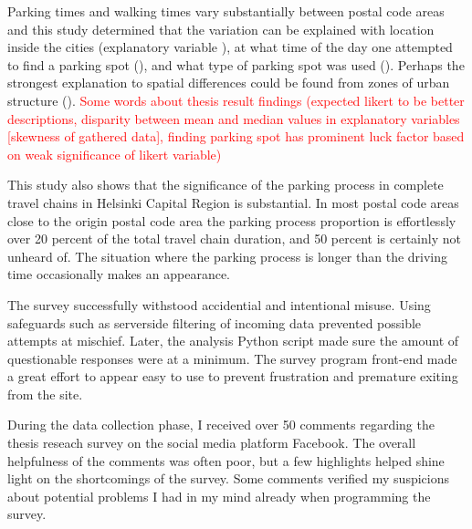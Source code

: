 Parking times and walking times vary substantially between postal code areas and this study determined that the variation can be explained with location inside the cities (explanatory variable ), at what time of the day one attempted to find a parking spot (), and what type of parking spot was used (). Perhaps the strongest explanation to spatial differences could be found from zones of urban structure (). 
\textcolor{red}{Some words about thesis result findings (expected likert to be better descriptions, disparity between mean and median values in explanatory variables [skewness of gathered data], finding parking spot has prominent luck factor based on weak significance of likert variable)}

This study also shows that the significance of the parking process in complete travel chains in Helsinki Capital Region is substantial. In most postal code areas close to the origin postal code area the parking process proportion is effortlessly over 20 percent of the total travel chain duration, and 50 percent is certainly not unheard of. The situation where the parking process is longer than the driving time occasionally makes an appearance. 

The survey successfully withstood accidential and intentional misuse. Using safeguards such as serverside filtering of incoming data prevented possible attempts at mischief. Later, the analysis Python script made sure the amount of questionable responses were at a minimum. The survey program front-end made a great effort to appear easy to use to prevent frustration and premature exiting from the site.

During the data collection phase, I received over 50 comments regarding the thesis reseach survey on the social media platform Facebook. The overall helpfulness of the comments was often poor, but a few highlights helped shine light on the shortcomings of the survey. Some comments verified my suspicions about potential problems I had in my mind already when programming the survey.

